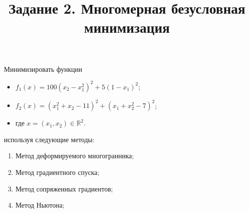 \documentclass[12pt,a4paper]{article}
\title{Задание 2. Многомерная безусловная минимизация}
\date{}
\begin{document}
\maketitle

Минимизировать функции
\begin{itemize}
    \item $f_1(x) = 100(x_2 - x_1^2)^2 + 5(1 - x_1)^2$;
    \item $f_2(x) = (x_1^2 + x_2 - 11)^2 + (x_1 + x_2^2 - 7)^2$;
    \item где $x = (x_1, x_2)\in\mathbb{R}^2$.
\end{itemize}

используя следующие методы:
\begin{enumerate}
    \item Метод деформируемого многогранника;
    \item Метод градиентного спуска;
    \item Метод сопряженных градиентов;
    \item Метод Ньютона;
\end{enumerate}
\end{document}
